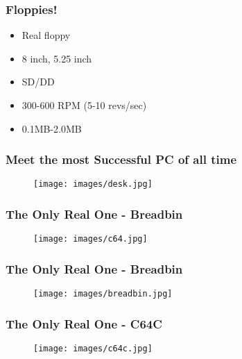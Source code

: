 \documentclass[aspectratio=43]{uva-inf-presentation}
\begin{document}

\begin{frame}
\frametitle{Floppies!}

\begin{itemize}
\item Real floppy
\item 8 inch, 5.25 inch
\item SD/DD
\item 300-600 RPM (5-10 revs/sec)
\item 0.1MB-2.0MB
\end{itemize}

\end{frame}


\begin{frame}
\frametitle{Meet the most Successful PC of all time}

\begin{figure}
\texttt{[image: images/desk.jpg]}
\end{figure}

\end{frame}


\begin{frame}
\frametitle{The Only Real One - Breadbin}

\begin{figure}
\texttt{[image: images/c64.jpg]}
\end{figure}

\end{frame}


\begin{frame}
\frametitle{The Only Real One - Breadbin}

\begin{figure}
\texttt{[image: images/breadbin.jpg]}
\end{figure}

\end{frame}


\begin{frame}
\frametitle{The Only Real One - C64C}

\begin{figure}
\texttt{[image: images/c64c.jpg]}
\end{figure}

\end{frame}
\end{document}
